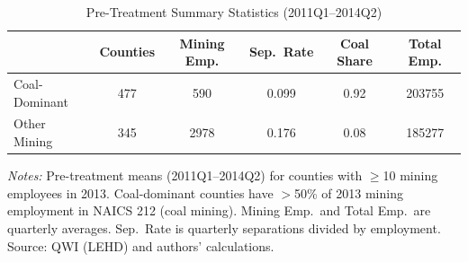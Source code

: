 \begin{table}[htbp]
\centering
\caption{Pre-Treatment Summary Statistics (2011Q1--2014Q2)}
\label{tab:sumstats}
\begin{threeparttable}
\begin{tabular}{lccccc}
\toprule
 & Counties & Mining Emp. & Sep.\ Rate & Coal Share & Total Emp. \\
\midrule
Coal-Dominant & 477 & 590 & 0.099 & 0.92 & 203755 \\
Other Mining & 345 & 2978 & 0.176 & 0.08 & 185277 \\
\bottomrule
\end{tabular}
\begin{tablenotes}[flushleft]\small
\item \textit{Notes:} Pre-treatment means (2011Q1--2014Q2) for counties with $\geq$10 mining employees in 2013. Coal-dominant counties have $>$50\% of 2013 mining employment in NAICS 212 (coal mining). Mining Emp.\ and Total Emp.\ are quarterly averages. Sep.\ Rate is quarterly separations divided by employment. Source: QWI (LEHD) and authors' calculations.
\end{tablenotes}
\end{threeparttable}
\end{table}

